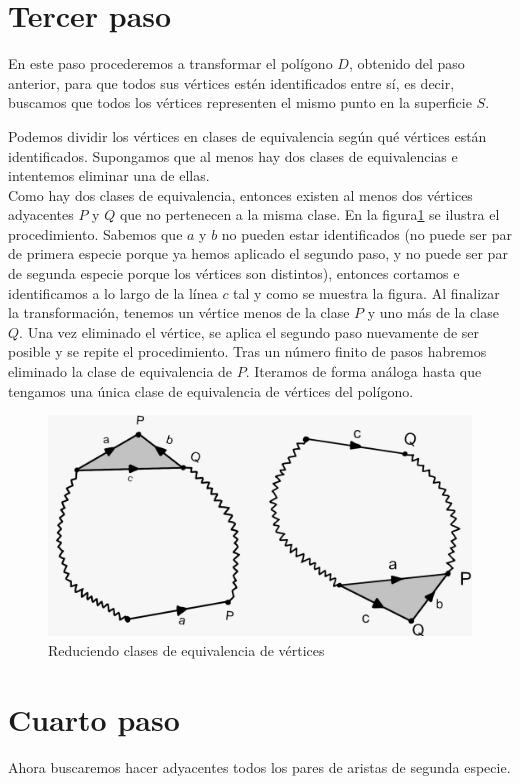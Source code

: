 \documentclass[a4paper,11pt,spanish, twoside, leqno]{tfg-uam}
\theoremstyle{definition}
\begin{document}
\section{Tercer paso}

En este paso procederemos a transformar el polígono $D$, obtenido del paso anterior, para que todos sus vértices estén identificados entre sí, es decir, buscamos que todos los vértices representen el mismo punto en la superficie $S$. 

Podemos dividir los vértices en clases de equivalencia según qué vértices están identificados. Supongamos que al menos hay dos clases de equivalencias e intentemos eliminar una de ellas.\\
Como hay dos clases de equivalencia, entonces existen al menos dos vértices adyacentes $P$ y $Q$ que no pertenecen a la misma clase. En la figura\ref{fig:paso3} se ilustra el procedimiento. Sabemos que $a$ y $b$ no pueden estar identificados (no puede ser par de primera especie porque ya hemos aplicado el segundo paso, y no puede ser par de segunda especie porque los vértices son distintos), entonces cortamos e identificamos a lo largo de la línea $c$ tal y como  se muestra la figura. Al finalizar la transformación, tenemos un vértice menos de la clase $P$ y uno más de la clase $Q$. Una vez eliminado el vértice, se aplica el segundo paso nuevamente de ser posible y se repite el procedimiento. Tras un número finito de pasos habremos eliminado la clase de equivalencia de $P$. Iteramos de forma análoga hasta que tengamos una única clase de equivalencia de vértices del polígono.

\begin{figure}[h!]
	\centering
	\includegraphics[width=0.4\linewidth]{imagenes/paso3.jpeg}
	\caption{Reduciendo clases de equivalencia de vértices}
	\label{fig:paso3}
\end{figure}


\section{Cuarto paso}

Ahora buscaremos hacer adyacentes todos los pares de aristas de segunda especie.
\end{document}
